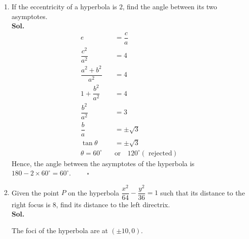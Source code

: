 \documentclass{report}
\newcommand{\sol}{\vspace{1em}\\\textbf{Sol.}}
\newcommand{\eos}{ \qquad \square}
\begin{document}
\begin{enumerate}
    \item If the eccentricity of a hyperbola is $2$, find the angle between its two
          asymptotes. \sol{}
          \begin{align*}
              e                                       & = \dfrac{c}{a}                               \\
              \dfrac{c^2}{a^2}                        & = 4                                          \\
              \dfrac{a^2 + b^2}{a^2}                  & = 4                                          \\
              1 + \dfrac{b^2}{a^2}                    & = 4                                          \\
              \dfrac{b^2}{a^2}                        & = 3                                          \\
              \dfrac{b}{a}                            & = \pm\sqrt{3}                                \\
              \tan\theta                              & = \pm\sqrt{3}                                \\
              \theta                 = 60^\circ \quad & \text{or} \quad 120^\circ (\text{ rejected})
          \end{align*}
          Hence, the angle between the asymptotes of the hyperbola is $180 - 2 \times 60^\circ = 60^\circ$. $\eos$

          \newpage
    \item Given the point $P$ on the hyperbola $\dfrac{x^2}{64} - \dfrac{y^2}{36} = 1$
          such that its distance to the right focus is $8$, find its distance to the left
          directrix. \sol{}

          The foci of the hyperbola are at $(\pm 10, 0)$.


\end{enumerate}
\end{document}
